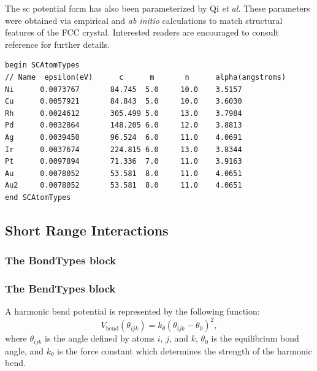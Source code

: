 \documentclass[]{book}
\begin{document}
The {\sc sc} potential form has also been parameterized by Qi {\it et
al.}\cite{Qi99} These parameters were obtained via empirical and {\it
ab initio} calculations to match structural features of the FCC
crystal.  Interested readers are encouraged to consult reference
\citealp{Qi99} for further details.

\begin{lstlisting}[caption={[An example of a SCAtomTypes block.] A
simple example of a SCAtomTypes block.  Distances ($\alpha$)
are given in \AA\ and energies ($\epsilon$) are (by convention) given in
units of eV.  These units must be specified in the {\tt Options} block
using the keyword {\tt MetallicEnergyUnitScaling}.  Without this {\tt
Options} keyword, the default units for $\epsilon$ are kcal/mol.  The
other parameters, $m$, $n$, and $c$ are unitless.},
label={sch:SCAtomTypes}]
begin SCAtomTypes
// Name  epsilon(eV)      c      m       n      alpha(angstroms)
Ni      0.0073767       84.745  5.0     10.0    3.5157 
Cu      0.0057921       84.843  5.0     10.0    3.6030
Rh      0.0024612       305.499 5.0     13.0    3.7984
Pd      0.0032864       148.205 6.0     12.0    3.8813
Ag      0.0039450       96.524  6.0     11.0    4.0691
Ir      0.0037674       224.815 6.0     13.0    3.8344  
Pt      0.0097894       71.336  7.0     11.0    3.9163
Au      0.0078052       53.581  8.0     11.0    4.0651
Au2     0.0078052       53.581  8.0     11.0    4.0651
end SCAtomTypes
\end{lstlisting}

\subsection{\label{section::ffShortRange}Short Range Interactions}
\subsubsection{\label{section:ffBond}The BondTypes block}
\subsubsection{\label{section:ffBend}The BendTypes block}
A harmonic bend potential is represented by the following function:
\begin{equation}
V_{\text{bend}}(\theta_{ijk}) = k_{\theta}( \theta_{ijk} - \theta_0
)^2, \label{eq:bendPot}
\end{equation}
where $\theta_{ijk}$ is the angle defined by atoms $i$, $j$, and $k$,
$\theta_0$ is the equilibrium bond angle, and $k_{\theta}$ is the
force constant which determines the strength of the harmonic bend.
\end{document}

